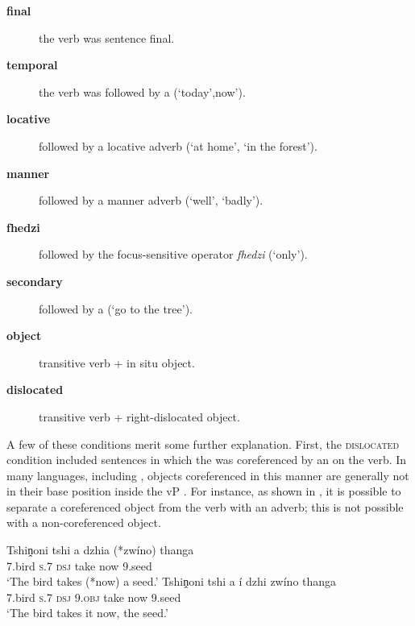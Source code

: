 \documentclass[output=paper,modfonts,nonflat,draftmode]{langsci/langscibook}
\begin{document}
\begin{description}
\item[\textbf{final}] the verb was sentence final.
\item[\textbf{temporal}] the verb was followed by a  (`today',now').
\item[\textbf{locative}] followed by a locative adverb (`at home', `in the forest').
\item[\textbf{manner}] followed by a manner adverb (`well', `badly').
\item[\textbf{fhedzi}] followed by the focus-sensitive operator \textit{fhedzi} (`only').
\item[\textbf{secondary}] followed by a  (`go to the tree').
\item[\textbf{object}] transitive verb + in situ object.
\item[\textbf{dislocated}] transitive verb + right-dislocated object.
\end{description}

A few of these conditions merit some further explanation. First, the
\textsc{dislocated} condition included sentences in which the  was
coreferenced by an  on the verb. In many  languages,
including , objects coreferenced in this manner are generally not
in their base position inside the vP \citep{Buell2005}. For instance, as shown in
, it is possible to separate a coreferenced object from the verb with an
adverb; this is not possible with a non-coreferenced object.


\ea \label{ex:kusmer:insitu-demonstration}
\ea \gll Tshiṋoni tshi a dzhia (*zwíno) thanga\\
		  7.bird  \textsc{s.7} \textsc{dsj} take now 9.seed\\
		\glt  `The bird takes (*now) a seed.'
  \ex \gll Tshiṋoni tshi a í dzhi zwíno thanga\\
		  7.bird  \textsc{s.7} \textsc{dsj} \textsc{9.obj} take now 9.seed\\
	 \glt `The bird takes it now, the seed.'
	 \z
 \z
\end{document}
